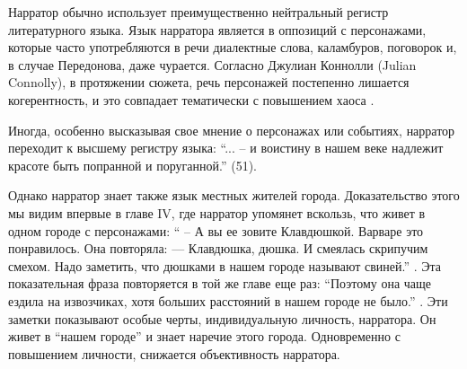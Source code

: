 \documentclass[12pt,a4paper]{article}
\begin{document}

Нарратор обычно использует преимущественно нейтральный регистр литературного языка. Язык нарратора является в оппозиций с персонажами, которые часто употребляются в речи диалектные слова, каламбуров, поговорок и, в случае Передонова, даже чурается. Согласно Джулиан Коннолли (Julian Connolly), в протяжении сюжета, речь персонажей постепенно лишается когерентность, и это совпадает тематически с повышением хаоса \parencite[358--359]{connolly1981}.

Иногда, особенно высказывая свое мнение о персонажах или событиях, нарратор переходит к высшему регистру языка: \enquote{... – и воистину в нашем веке надлежит красоте быть попранной и поруганной.} (51).


Однако нарратор знает также язык местных жителей города. Доказательство этого мы видим впервые в главе IV, где нарратор упомянет вскользь, что живет в одном городе с персонажами: \enquote{ – А вы ее зовите Клавдюшкой.
Варваре это понравилось. Она повторяла:
— Клавдюшка, дюшка.
И смеялась скрипучим смехом. Надо заметить, что дюшками в 
нашем городе называют свиней.} \parencite[33]{sologub2004}. Эта показательная фраза повторяется в той же главе еще раз: \enquote{Поэтому она чаще ездила на извозчиках,
хотя больших расстояний в нашем городе не было.} \parencite[34]{sologub2004}. Эти заметки показывают особые черты, индивидуальную личность,  нарратора. Он живет в \enquote{нашем городе} и знает наречие этого города. Одновременно с повышением личности, снижается объективность нарратора.
\end{document}
